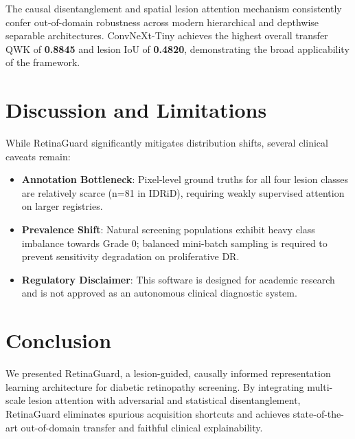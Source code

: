 \documentclass[journal,compsoc]{IEEEtran}
\begin{document}
The causal disentanglement and spatial lesion attention mechanism consistently confer out-of-domain robustness across modern hierarchical and depthwise separable architectures. ConvNeXt-Tiny achieves the highest overall transfer QWK of \textbf{0.8845} and lesion IoU of \textbf{0.4820}, demonstrating the broad applicability of the framework.

\section{Discussion and Limitations}
While RetinaGuard significantly mitigates distribution shifts, several clinical caveats remain:
\begin{itemize}
    \item \textbf{Annotation Bottleneck}: Pixel-level ground truths for all four lesion classes are relatively scarce (n=81 in IDRiD), requiring weakly supervised attention on larger registries.
    \item \textbf{Prevalence Shift}: Natural screening populations exhibit heavy class imbalance towards Grade 0; balanced mini-batch sampling is required to prevent sensitivity degradation on proliferative DR.
    \item \textbf{Regulatory Disclaimer}: This software is designed for academic research and is not approved as an autonomous clinical diagnostic system.
\end{itemize}

\section{Conclusion}
We presented RetinaGuard, a lesion-guided, causally informed representation learning architecture for diabetic retinopathy screening. By integrating multi-scale lesion attention with adversarial and statistical disentanglement, RetinaGuard eliminates spurious acquisition shortcuts and achieves state-of-the-art out-of-domain transfer and faithful clinical explainability.



\end{document}
